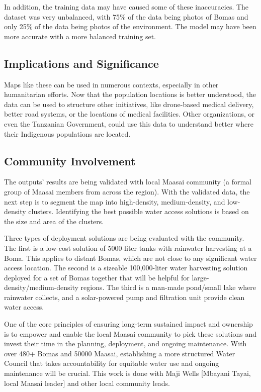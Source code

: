 \documentclass[10pt]{article}
\begin{document}
In addition, the training data may have caused some of these inaccuracies. The dataset was very unbalanced, with 75\% of the data being photos of Bomas and only 25\% of the data being photos of the environment. The model may have been more accurate with a more balanced training set.

\subsection{Implications and Significance}

Maps like these can be used in numerous contexts, especially in other humanitarian efforts. Now that the population locations is better understood, the data can be used to structure other initiatives, like drone-based medical delivery, better road systems, or the locations of medical facilities. Other organizations, or even the Tanzanian Government, could use this data to understand better where their Indigenous populations are located.

\subsection{Community Involvement}

The outputs' results are being validated with local Maasai community (a formal group of Maasai members from across the region). With the validated data, the next step is to segment the map into high-density, medium-density, and low-density clusters. Identifying the best possible water access solutions is based on the size and area of the clusters.

Three types of deployment solutions are being evaluated with the community. The first is a low-cost solution of 5000-liter tanks with rainwater harvesting at a Boma. This applies to distant Bomas, which are not close to any significant water access location. The second is a sizeable 100,000-liter water harvesting solution deployed for a set of Bomas together that will be helpful for large-density/medium-density regions. The third is a man-made pond/small lake where rainwater collects, and a solar-powered pump and filtration unit provide clean water access.

One of the core principles of ensuring long-term sustained impact and ownership is to empower and enable the local Maasai community to pick these solutions and invest their time in the planning, deployment, and ongoing maintenance. With over 480+ Bomas and 50000 Maasai, establishing a more structured Water Council that takes accountability for equitable water use and ongoing maintenance will be crucial. This work is done with Maji Wells [Mbayani Tayai, local Maasai leader] and other local community leads.
\end{document}
